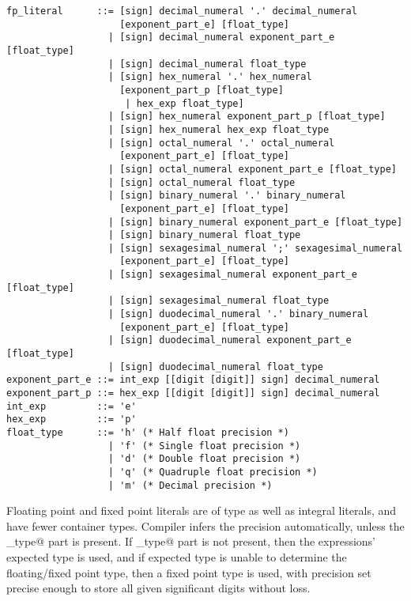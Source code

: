 \syntax\begin{lstlisting}
fp_literal      ::= [sign] decimal_numeral '.' decimal_numeral
                    [exponent_part_e] [float_type]
                  | [sign] decimal_numeral exponent_part_e [float_type]
                  | [sign] decimal_numeral float_type
                  | [sign] hex_numeral '.' hex_numeral 
                    [exponent_part_p [float_type] 
                     | hex_exp float_type]
                  | [sign] hex_numeral exponent_part_p [float_type]
                  | [sign] hex_numeral hex_exp float_type
                  | [sign] octal_numeral '.' octal_numeral 
                    [exponent_part_e] [float_type]
                  | [sign] octal_numeral exponent_part_e [float_type]
                  | [sign] octal_numeral float_type
                  | [sign] binary_numeral '.' binary_numeral 
                    [exponent_part_e] [float_type]
                  | [sign] binary_numeral exponent_part_e [float_type]
                  | [sign] binary_numeral float_type
                  | [sign] sexagesimal_numeral ';' sexagesimal_numeral
                    [exponent_part_e] [float_type]
                  | [sign] sexagesimal_numeral exponent_part_e [float_type]
                  | [sign] sexagesimal_numeral float_type
                  | [sign] duodecimal_numeral '.' binary_numeral 
                    [exponent_part_e] [float_type]
                  | [sign] duodecimal_numeral exponent_part_e [float_type]
                  | [sign] duodecimal_numeral float_type
exponent_part_e ::= int_exp [[digit [digit]] sign] decimal_numeral
exponent_part_p ::= hex_exp [[digit [digit]] sign] decimal_numeral
int_exp         ::= 'e'
hex_exp         ::= 'p'
float_type      ::= 'h' (* Half float precision *)
                  | 'f' (* Single float precision *)
                  | 'd' (* Double float precision *)
                  | 'q' (* Quadruple float precision *)
                  | 'm' (* Decimal precision *)
\end{lstlisting}

Floating point and fixed point literals are of type \lstinline@Number@ as well as integral literals, and have fewer container types. Compiler infers the precision automatically, unless the \lstinline@float_type@ part is present. If \lstinline@float_type@ part is not present, then the expressions' expected type is used, and if expected type is unable to determine the floating/fixed point type, then a fixed point type is used, with precision set precise enough to store all given significant digits without loss. 

